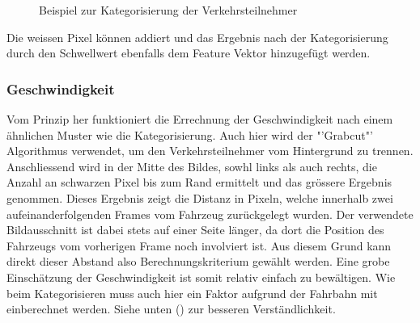 {\begin{figure}[H]
  \centering
  \caption{Beispiel zur Kategorisierung der Verkehrsteilnehmer}
  \label{bCategorize}
\end{figure}

Die weissen Pixel können addiert und das Ergebnis nach der Kategorisierung durch den Schwellwert ebenfalls dem Feature Vektor hinzugefügt werden. \cite{GrabCut, CountNonZero}

\subsubsection{Geschwindigkeit}
Vom Prinzip her funktioniert die Errechnung der Geschwindigkeit nach einem ähnlichen Muster wie die Kategorisierung. Auch hier wird der "'Grabcut"' Algorithmus verwendet, um den Verkehrsteilnehmer vom Hintergrund zu trennen. Anschliessend wird in der Mitte des Bildes, sowhl links als auch rechts, die Anzahl an schwarzen Pixel bis zum Rand ermittelt und das grössere Ergebnis genommen. Dieses Ergebnis zeigt die Distanz in Pixeln, welche innerhalb zwei aufeinanderfolgenden Frames vom Fahrzeug zurückgelegt wurden. Der verwendete Bildausschnitt ist dabei stets auf einer Seite länger, da dort die Position des Fahrzeugs vom vorherigen Frame noch involviert ist. Aus diesem Grund kann direkt dieser Abstand also Berechnungskriterium gewählt werden. Eine grobe Einschätzung der Geschwindigkeit ist somit relativ einfach zu bewältigen. Wie beim Kategorisieren muss auch hier ein Faktor aufgrund der Fahrbahn mit einberechnet werden. Siehe unten () zur besseren Verständlichkeit.

}

